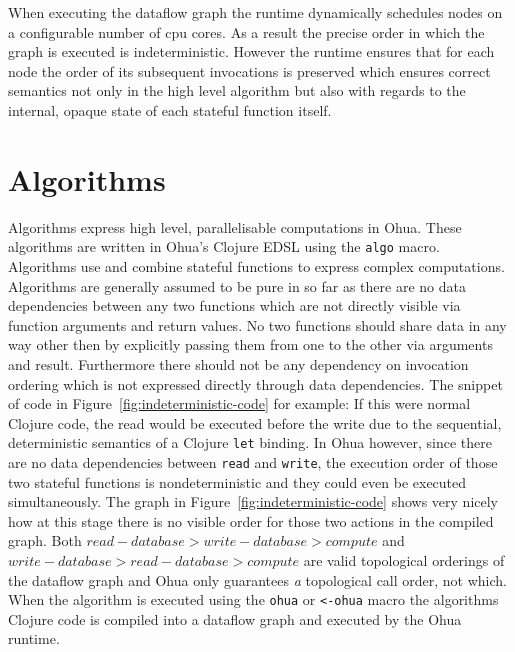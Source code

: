 When executing the dataflow graph the runtime dynamically schedules nodes on a configurable number of cpu cores.
As a result the precise order in which the graph is executed is indeterministic.
However the runtime ensures that for each node the order of its subsequent invocations is preserved which ensures correct semantics not only in the high level algorithm but also with regards to the internal, opaque state of each stateful function itself.

\section{Algorithms}

Algorithms express high level, parallelisable computations in Ohua.
These algorithms are written in Ohua's Clojure EDSL using the \texttt{algo} macro.
Algorithms use and combine stateful functions to express complex computations.
Algorithms are generally assumed to be pure in so far as there are no data dependencies between any two functions which are not directly visible via function arguments and return values.
No two functions should share data in any way other then by explicitly passing them from one to the other via arguments and result.
Furthermore there should not be any dependency on invocation ordering which is not expressed directly through data dependencies.
The snippet of code in Figure~\ref{fig:indeterministic-code} for example: If this were normal Clojure code, the read would be executed before the write due to the sequential, deterministic semantics of a Clojure \texttt{let} binding.
In Ohua however, since there are no data dependencies between \texttt{read} and \texttt{write}, the execution order of those two stateful functions is nondeterministic and they could even be executed simultaneously.
The graph in Figure~\ref{fig:indeterministic-code} shows very nicely how at this stage there is no visible order for those two actions in the compiled graph.
Both $read-database > write-database > compute$ and $write-database > read-database > compute$ are valid topological orderings of the dataflow graph and Ohua only guarantees \emph{a} topological call order, not which.
When the algorithm is executed using the \texttt{ohua} or \texttt{<-ohua} macro the algorithms Clojure code is compiled into a dataflow graph and executed by the Ohua runtime.

